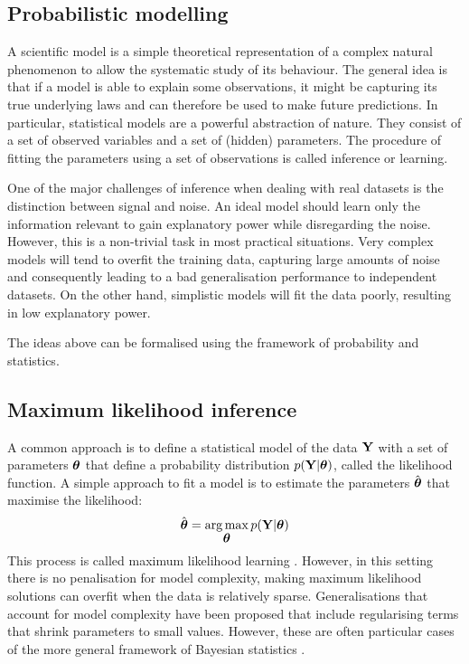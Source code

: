 \subsection{Probabilistic modelling} \label{section:probabilistic_modelling}

A scientific model is a simple theoretical representation of a complex natural phenomenon to allow the systematic study of its behaviour. The general idea is that if a model is able to explain some observations, it might be capturing its true underlying laws and can therefore be used to make future predictions.
In particular, statistical models are a powerful abstraction of nature. They consist of a set of observed variables and a set of (hidden) parameters. The procedure of fitting the parameters using a set of observations is called inference or learning.

One of the major challenges of inference when dealing with real datasets is the distinction between signal and noise. An ideal model should learn only the information relevant to gain explanatory power while disregarding the noise. However, this is a non-trivial task in most practical situations. Very complex models will tend to overfit the training data, capturing large amounts of noise and consequently leading to a bad generalisation performance to independent datasets. On the other hand, simplistic models will fit the data poorly, resulting in low explanatory power.

The ideas above can be formalised using the framework of probability and statistics.

\subsection{Maximum likelihood inference} \label{section:maximum_likelihood}

A common approach is to define a statistical model of the data ${\bf Y}$ with a set of parameters $\mbox{\boldmath $\theta$}$ that define a probability distribution $p({\bf Y}|\mbox{\boldmath $\theta$})$, called the likelihood function. A simple approach to fit a model is to estimate the parameters $\hat{\mbox{\boldmath $\theta$}}$ that maximise the likelihood:
\[
	\hat{\mbox{\boldmath $\theta$}} = \operatorname*{arg\,max}_{\mbox{\boldmath $\theta$}} p({\bf Y}|\mbox{\boldmath $\theta$})
\]
This process is called maximum likelihood learning \cite{Stigler2008,Bishop2006,Murphy}. However, in this setting there is no penalisation for model complexity, making maximum likelihood solutions can overfit when the data is relatively sparse. Generalisations that account for model complexity have been proposed that include regularising terms that shrink parameters to small values. However, these are often particular cases of the more general framework of Bayesian statistics \cite{Hastie,Bishop2006,Murphy}.

